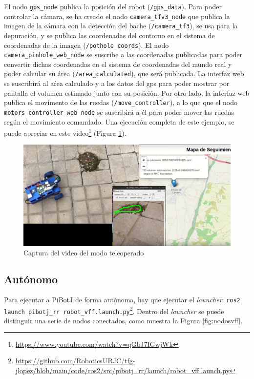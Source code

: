 El nodo \verb|gps_node| publica la posición del robot (\verb|/gps_data|). Para poder controlar la cámara, se ha creado el nodo \verb|camera_tfv3_node| que publica la imagen de la cámara con la detección del bache (\verb|/camera_tf3|), se usa para la depuración, y se publica las coordenadas del contorno en el sistema de coordenadas de la imagen (\verb|/pothole_coords|). El nodo \verb|camera_pinhole_web_node| se suscribe a las coordenadas publicadas para poder convertir dichas coordenadas en el sistema de coordenadas del mundo real y poder calcular su área (\verb|/area_calculated|), que será publicada. La interfaz web se suscribirá al aŕea calculado y a los datos del gps para poder mostrar por pantalla el volumen estimado junto con su posición. Por otro lado, la interfaz web publica el movimento de las ruedas (\verb|/move_controller|), a lo que que el nodo \verb|motors_controller_web_node| se suscribirá a él para poder mover las ruedas según el movimiento comandado. Una ejecución completa de este ejemplo, se puede apreciar en este video\footnote{\url{https://www.youtube.com/watch?v=qGbJ7IGwjWk}} (Figura \ref{fig:expteleop}).


\begin{figure} [h!]
	\begin{center}
		\includegraphics[width=15cm]{figs/cap7/teleop_final.png}
	\end{center}
	\caption{Captura del video del modo teleoperado}
	\label{fig:expteleop}
\end{figure}


\subsection{Autónomo}

Para ejecutar a PiBotJ de forma autónoma, hay que ejecutar el \textit{launcher}: \verb|ros2 launch pibotj_rr robot_vff.launch.py|\footnote{\url{https://github.com/RoboticsURJC/tfg-jlopez/blob/main/code/ros2/src/pibotj_rr/launch/robot_vff.launch.py}}. Dentro del \textit{launcher} se puede distinguir una serie de nodos conectados, como muestra la Figura \ref{fig:nodosvff}. 


